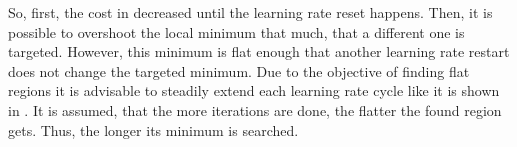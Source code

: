 So, first, the cost in decreased until the learning rate reset happens.
Then, it is possible to overshoot the local minimum that much, that a different one is targeted.
However, this minimum is flat enough that another learning rate restart does not change the targeted minimum.
Due to the objective of finding flat regions it is advisable to steadily extend each learning rate cycle like it is shown in .
It is assumed, that the more iterations are done, the flatter the found region gets.
Thus, the longer its minimum is searched.